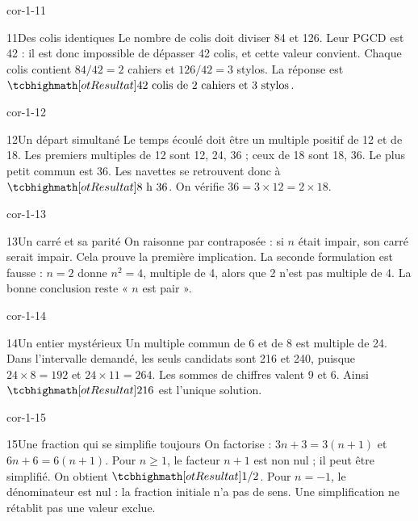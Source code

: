 \begin{blocLivre}{cor-1-11}
\begin{corrige}{11}{Des colis identiques}
Le nombre de colis doit diviser 84 et 126. Leur PGCD est 42 : il est donc impossible de dépasser 42 colis, et cette valeur convient. Chaque colis contient $84/42=2$ cahiers et $126/42=3$ stylos. La réponse est $\res{42\text{ colis de 2 cahiers et 3 stylos}}$.
\end{corrige}
\end{blocLivre}
\begin{blocLivre}{cor-1-12}
\begin{corrige}{12}{Un départ simultané}
Le temps écoulé doit être un multiple positif de 12 et de 18. Les premiers multiples de 12 sont 12, 24, 36 ; ceux de 18 sont 18, 36. Le plus petit commun est 36. Les navettes se retrouvent donc à $\res{8\text{ h }36}$. On vérifie $36=3\times12=2\times18$.
\end{corrige}
\end{blocLivre}
\begin{blocLivre}{cor-1-13}
\begin{corrige}{13}{Un carré et sa parité}
On raisonne par contraposée : si $n$ était impair, son carré serait impair. Cela prouve la première implication. La seconde formulation est fausse : $n=2$ donne $n^2=4$, multiple de 4, alors que 2 n’est pas multiple de 4. La bonne conclusion reste « $n$ est pair ».
\end{corrige}
\end{blocLivre}
\begin{blocLivre}{cor-1-14}
\begin{corrige}{14}{Un entier mystérieux}
Un multiple commun de 6 et de 8 est multiple de 24. Dans l’intervalle demandé, les seuls candidats sont 216 et 240, puisque $24\times8=192$ et $24\times11=264$. Les sommes de chiffres valent 9 et 6. Ainsi $\res{216}$ est l’unique solution.
\end{corrige}
\end{blocLivre}
\begin{blocLivre}{cor-1-15}
\begin{corrige}{15}{Une fraction qui se simplifie toujours}
On factorise : $3n+3=3(n+1)$ et $6n+6=6(n+1)$. Pour $n\ge1$, le facteur $n+1$ est non nul ; il peut être simplifié. On obtient $\res{1/2}$. Pour $n=-1$, le dénominateur est nul : la fraction initiale n’a pas de sens. Une simplification ne rétablit pas une valeur exclue.
\end{corrige}
\end{blocLivre}

